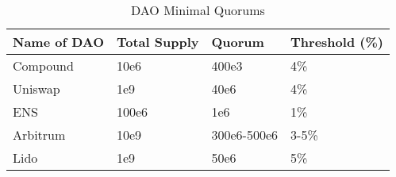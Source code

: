 \begin{table*}[t]
    \centering
    \caption{DAO Minimal Quorums}
    \label{table:dao-metrics}
    \begin{tabular}{|l|l|l|l|}
    \hline
    \textbf{Name of DAO} & \textbf{Total Supply} & \textbf{Quorum} & \textbf{Threshold (\%)} \\ \hline
    Compound             & 10e6            & 400e3             & 4\%                     \\ \hline
    Uniswap              & 1e9             & 40e6              & 4\%                     \\ \hline
    ENS                  & 100e6           & 1e6               & 1\%                     \\ \hline
    Arbitrum             & 10e9            & 300e6-500e6       & 3-5\%                   \\ \hline
    Lido                 & 1e9             & 50e6              & 5\%                     \\ \hline
    \end{tabular}
\end{table*}